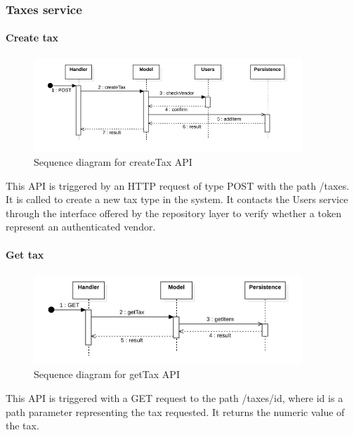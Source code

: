 \subsubsection{Taxes service}
\paragraph*{Create tax}
\begin{figure}[H]
    \includegraphics[width=0.9\textwidth]{res/images/sequence-diagrams/taxes/createTax.png}
    \caption{Sequence diagram for createTax API}
\end{figure}
This API is triggered by an HTTP request of type POST with the path /taxes. It is called to create a new tax type in the system. It contacts the Users service through the interface offered by the repository layer to verify
whether a token represent an authenticated vendor.

\paragraph*{Get tax}
\begin{figure}[H]
    \includegraphics[width=0.9\textwidth]{res/images/sequence-diagrams/taxes/getTax.png}
    \caption{Sequence diagram for getTax API}
\end{figure}
This API is triggered with a GET request to the path /taxes/{id}, where id is a path parameter representing the tax requested. It returns the numeric value of the tax.

